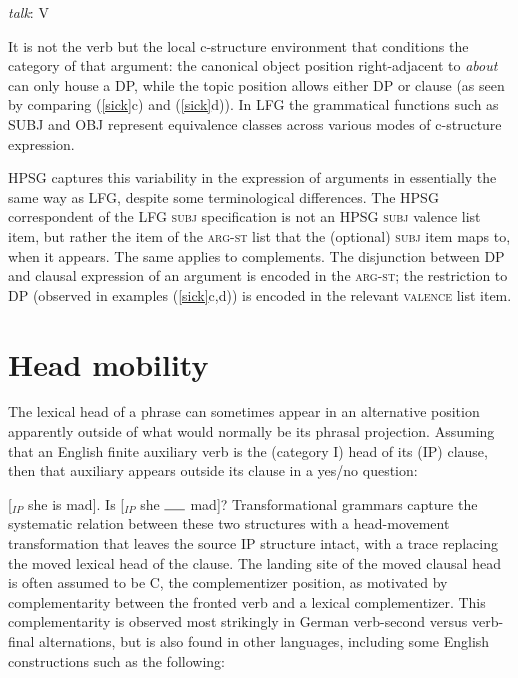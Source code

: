 \eal \label{talk-about}
{{\it talk}\/: V}\qquad{}    
\zl

\noindent
It is not the verb but the local c-structure environment that conditions the category of that argument: the canonical object position right-adjacent to \textit{about} can only house a DP, while the topic position allows either DP or clause (as seen by comparing (\ref{sick}c) and (\ref{sick}d)).  In LFG the grammatical functions such as SUBJ and OBJ represent equivalence classes across various modes of c-structure expression.  

HPSG captures this variability in the expression of arguments in essentially the same way as LFG, despite some terminological differences.  The HPSG correspondent of the LFG \textsc{subj} specification is not an HPSG \textsc{subj} valence list item, but rather the item of the \textsc{arg-st} list that the (optional) \textsc{subj}  item maps to, when it appears.  The same applies to complements.  The disjunction between DP and clausal expression of an argument is encoded in the \textsc{arg-st;} the restriction to DP (observed in examples (\ref{sick}c,d)) is encoded in the relevant \textsc{valence} list item.  


\section{Head mobility} 
\label{mobile-sec}
The lexical head of a phrase can sometimes appear in an alternative position apparently outside of what would normally be its phrasal projection.  Assuming that an English finite auxiliary verb is the (category I) head of its (IP) clause, then that auxiliary appears outside its clause in a yes/no question:

\eal 
\label{mad}
\ex {} [$_{IP}$ she is mad].
\ex  Is   [$_{IP}$ she $\rule{0.5cm}{0.15mm}$ mad]?
\zl
Transformational grammars capture the systematic relation between these two structures with a head-movement transformation that leaves the source IP structure intact, with a trace replacing the moved lexical head of the clause.  The landing site of the moved clausal head is often assumed to be C, the complementizer position, as motivated by complementarity between the fronted verb and a lexical complementizer.  This complementarity is observed most strikingly in German verb-second versus verb-final alternations, but is also found in other languages, including some English constructions such as the following:  

